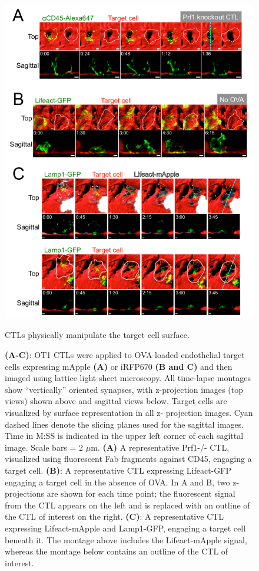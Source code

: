 \begin{figure}[htbp]
	\centering
	\includegraphics[width=\textwidth]{../figures/chapter2/fig7supp.png}
	\caption{CTLs physically manipulate the target cell surface.}
	\caption*{\textbf{(A-C)}: OT1 CTLs were applied to OVA-loaded endothelial target cells expressing mApple \textbf{(A)} or iRFP670 \textbf{(B and C)} and then imaged using lattice light-sheet microscopy. All time-lapse montages show “vertically” oriented synapses, with z-projection images (top views) shown above and sagittal views below. Target cells are visualized by surface representation in all z- projection images. Cyan dashed lines denote the slicing planes used for the sagittal images. Time in M:SS is indicated in the upper left corner of each sagittal image. Scale bars = 2 $\mu$m. \textbf{(A)} A representative Prf1-/- CTL, visualized using fluorescent Fab fragments against CD45, engaging a target cell. \textbf{(B)}: A representative CTL expressing Lifeact-GFP engaging a target cell in the absence of OVA. In A and B, two z-projections are shown for each time point; the fluorescent signal from the CTL appears on the left and is replaced with an outline of the CTL of interest on the right. \textbf{(C)}: A representative CTL expressing Lifeact-mApple and Lamp1-GFP, engaging a target cell beneath it. The montage above includes the Lifeact-mApple signal, whereas the montage below contains an outline of the CTL of interest.}
	\label{fig:fig7supp}
\end{figure}


